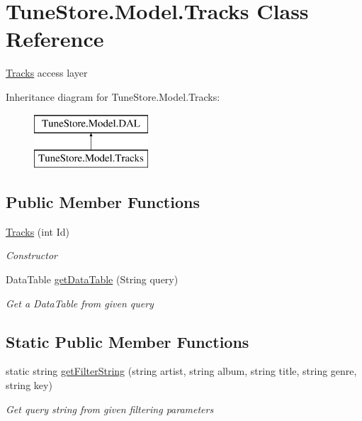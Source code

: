\hypertarget{class_tune_store_1_1_model_1_1_tracks}{\section{Tune\+Store.\+Model.\+Tracks Class Reference}
\label{class_tune_store_1_1_model_1_1_tracks}
}


\hyperlink{class_tune_store_1_1_model_1_1_tracks}{Tracks} access layer  


Inheritance diagram for Tune\+Store.\+Model.\+Tracks\+:\begin{figure}[H]
\begin{center}
\leavevmode
\includegraphics[height=2.000000cm]{class_tune_store_1_1_model_1_1_tracks}
\end{center}
\end{figure}
\subsection*{Public Member Functions}
\begin{DoxyCompactItemize}
\item 
\hyperlink{class_tune_store_1_1_model_1_1_tracks_ac5ca23ca4329b7a9f060d6307275e052}{Tracks} (int Id)
\begin{DoxyCompactList}\small\item\em Constructor \end{DoxyCompactList}\item 
Data\+Table \hyperlink{class_tune_store_1_1_model_1_1_tracks_ab86f9768aa3f019fde99e3545c1fc5b2}{get\+Data\+Table} (String query)
\begin{DoxyCompactList}\small\item\em Get a Data\+Table from given query \end{DoxyCompactList}\end{DoxyCompactItemize}
\subsection*{Static Public Member Functions}
\begin{DoxyCompactItemize}
\item 
static string \hyperlink{class_tune_store_1_1_model_1_1_tracks_a99770d353dc98772b4d24a7eaf90c831}{get\+Filter\+String} (string artist, string album, string title, string genre, string key)
\begin{DoxyCompactList}\small\item\em Get query string from given filtering parameters \end{DoxyCompactList}\end{DoxyCompactItemize}

